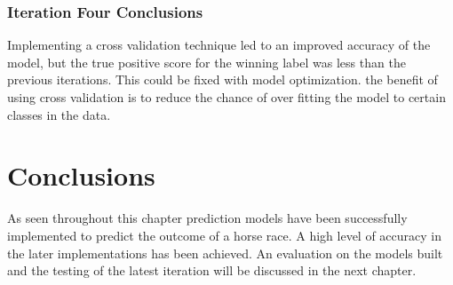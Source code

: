 \subsubsection{Iteration Four Conclusions}
Implementing a cross validation technique led to an improved accuracy of the model, but the true positive score for the winning label was less than the previous iterations. This could be fixed with model optimization. the benefit of using cross validation is to reduce the chance of over fitting the model to certain classes in the data.  
\section{Conclusions}
 As seen throughout this chapter prediction models have been successfully implemented to predict the outcome of a horse race. A high level of accuracy in the later implementations has been achieved. An evaluation on the models built and the testing of the latest iteration will be discussed in the next chapter.